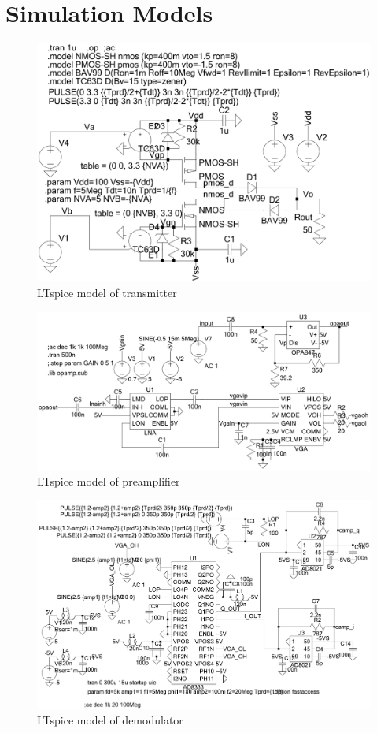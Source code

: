 \chapter{Simulation Models}
\begin{figure}[htbp]
	\centering
	\includegraphics[width=.9\textwidth]{Figures/appendix/ltspice_transmitter.pdf}
	\caption{LTspice model of transmitter}
	\label{fig:app_ltspice_transmitter}
\end{figure}
\begin{figure}[htbp]
	\centering
	\includegraphics[width=.9\textwidth]{Figures/appendix/ltspice_preamp.pdf}
	\caption{LTspice model of preamplifier}
	\label{fig:app_ltspice_preamp}
\end{figure}
\begin{figure}[htbp]
	\centering
	\includegraphics[width=.9\textwidth]{Figures/appendix/ltspice_demod.pdf}
	\caption{LTspice model of demodulator}
	\label{fig:app_ltspice_demod}
\end{figure}
